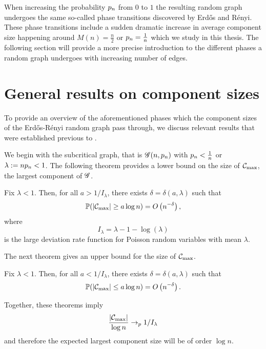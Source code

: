 When increasing the probability $p_n$ from $0$ to $1$ the resulting random graph undergoes the same so-called phase transitions
discovered by Erd\H{o}s and Rényi.
These phase transitions include a sudden dramatic increase in average component size happening around $M(n) = \frac{n}{2}$ or $p_n = \frac{1}{n}$
which we study in this thesis.
The following section will provide a more precise introduction to the different phases a random graph undergoes
with increasing number of edges.


\section{General results on component sizes}

To provide an overview of the aforementioned phases
which the component sizes of the Erd\H{o}s-Rényi random graph pass through,
we discuss relevant results that were established previous to \cite{Aldous.1997}.

We begin with the subcritical graph, that is
$\mathscr{G}(n, p_n)$ with $p_n < \frac{1}{n}$
or $\lambda := n p_n < 1$.
The following theorem provides a lower bound on the size of $\mathcal{C}_{\max}$, the largest component of $\mathscr{G}$.
\begin{theorem}
	Fix $\lambda < 1$. 
	Then, for all $a > 1/I_{\lambda}$, 
	there exists $\delta = \delta(a, \lambda)$ such that
	\begin{equation}
		\mathbb{P}( |\mathcal{C}_{\max}| \geq a \log n ) = O\left(n^{-\delta}\right),
	\end{equation}
	where 
	\begin{equation}
		I_{\lambda} = \lambda - 1 - \log(\lambda)
	\end{equation}
	is the large deviation rate function for Poisson random variables with mean $\lambda$.
\end{theorem}
The next theorem gives an upper bound for the size of $\mathcal{C}_{\max}$.
\begin{theorem}
	Fix $\lambda < 1$. 
	Then, for all $a < 1/I_{\lambda}$, 
	there exists $\delta = \delta(a, \lambda)$ such that
	\begin{equation}
	\mathbb{P}( |\mathcal{C}_{\max}| \leq a \log n ) = O\left(n^{-\delta}\right).
	\end{equation}
\end{theorem}
Together, these theorems imply
\begin{equation} \label{I: conv prob}
	\frac{|\mathcal{C}_{\max}|}{\log n} \rightarrow_p 1/I_{\lambda}
\end{equation}
and therefore the expected largest component size will be of order $\log n$.


